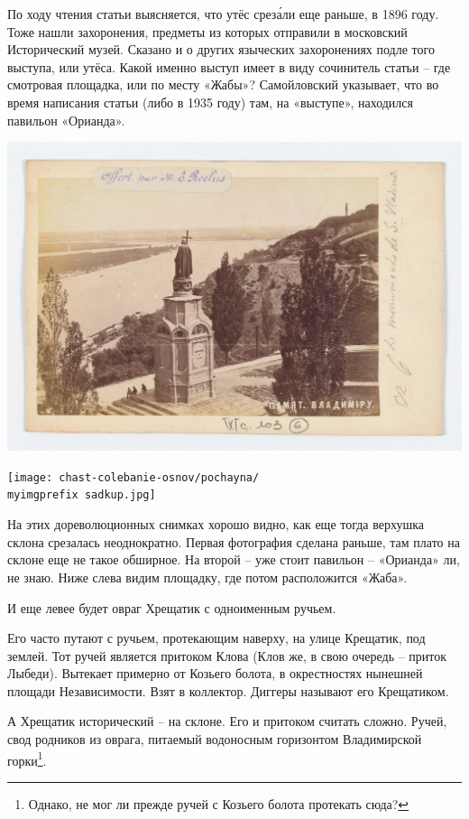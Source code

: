 По ходу чтения статьи выясняется, что утёс срез\'али еще раньше, в 1896 году. Тоже нашли захоронения, предметы из которых отправили в московский Исторический музей. Сказано и о других языческих захоронениях подле того выступа, или утёса. Какой именно выступ имеет в виду сочинитель статьи – где смотровая площадка, или по месту «Жабы»? Самойловский указывает, что во время написания статьи (либо в 1935 году) там, на «выступе», находился павильон «Орианда».

\begin{center}
\includegraphics[width=0.94\linewidth]{chast-colebanie-osnov/pochayna/kupsob.jpg}
\end{center}

\begin{center}
\texttt{[image: chast-colebanie-osnov/pochayna/\\myimgprefix sadkup.jpg]}
\end{center}

На этих дореволюционных снимках хорошо видно, как еще тогда верхушка склона срезалась неоднократно. Первая фотография сделана раньше, там плато на склоне еще не такое обширное. На второй – уже стоит павильон – «Орианда» ли, не знаю. Ниже слева видим площадку, где потом расположится «Жаба».

И еще левее будет овраг Хрещатик с одноименным ручьем. 

Его часто путают с ручьем, протекающим наверху, на улице Крещатик, под землей. Тот ручей является притоком Клова (Клов же, в свою очередь – приток Лыбеди). Вытекает примерно от Козьего болота, в окрестностях нынешней площади Независимости. Взят в коллектор. Диггеры называют его Крещатиком.

А Хрещатик исторический – на склоне. Его и притоком считать сложно. Ручей, свод родников из оврага, питаемый водоносным горизонтом Владимирской горки\footnote{Однако, не мог ли прежде ручей с Козьего болота протекать сюда?}.

